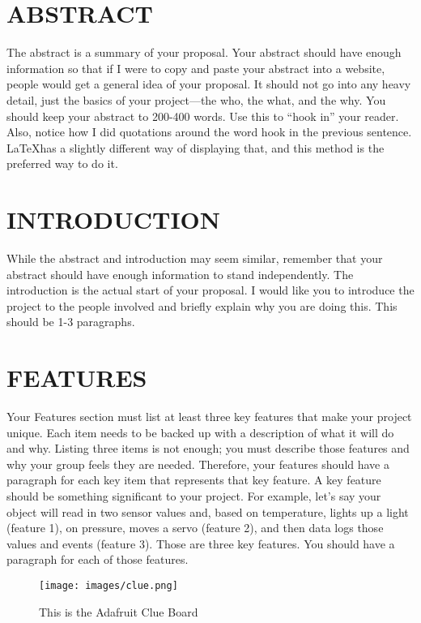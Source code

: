 \documentclass[12pt]{article}
\begin{document}
\section{ABSTRACT}
The abstract is a summary of your proposal. Your abstract should have enough information so that if I were to copy and paste your abstract into a website, people would get a general idea of your proposal. It should not go into any heavy detail, just the basics of your project—the who, the what, and the why. You should keep your abstract to 200-400 words. Use this to ``hook in'' your reader. Also, notice how I did quotations around the word hook in the previous sentence. \LaTeX has a slightly different way of displaying that, and this method is the preferred way to do it.

\section{INTRODUCTION}
While the abstract and introduction may seem similar, remember that your abstract should have enough information to stand independently. The introduction is the actual start of your proposal. I would like you to introduce the project to the people involved and briefly explain why you are doing this. This should be 1-3 paragraphs.

\section{FEATURES}
Your Features section must list at least three key features that make your project unique. Each item needs to be backed up with a description of what it will do and why. Listing three items is not enough; you must describe those features and why your group feels they are needed. Therefore, your features should have a paragraph for each key item that represents that key feature. A key feature should be something significant to your project. For example, let's say your object will read in two sensor values and, based on temperature, lights up a light (feature 1), on pressure, moves a servo (feature 2), and then data logs those values and events (feature 3). Those are three key features. You should have a paragraph for each of those features.


\begin{figure}[!t]
\centering
\texttt{[image: images/clue.png]}
\caption{This is the Adafruit Clue Board}
\label{fig:clue}
\end{figure}
\end{document}
